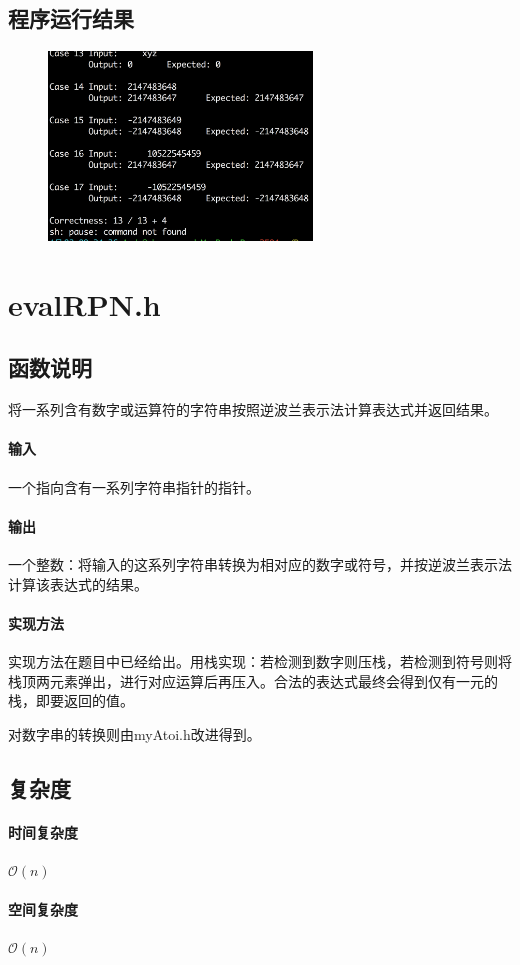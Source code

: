 \documentclass{homework}
\begin{document}
\subsection{程序运行结果}
\begin{figure}[H]
    \centering
    \includegraphics[width=7cm]{atoi.png}
\end{figure}
\section{evalRPN.h}
\subsection{函数说明}
将一系列含有数字或运算符的字符串按照逆波兰表示法计算表达式并返回结果。
\paragraph{输入}
一个指向含有一系列字符串指针的指针。
\paragraph{输出}
一个整数：将输入的这系列字符串转换为相对应的数字或符号，并按逆波兰表示法计算该表达式的结果。
\paragraph{实现方法}
实现方法在题目中已经给出。用栈实现：若检测到数字则压栈，若检测到符号则将栈顶两元素弹出，进行对应运算后再压入。合法的表达式最终会得到仅有一元的栈，即要返回的值。

对数字串的转换则由myAtoi.h改进得到。
\subsection{复杂度}
\paragraph{时间复杂度}
$\mathcal{O}(n)$
\paragraph{空间复杂度}
$\mathcal{O}(n)$
\end{document}
